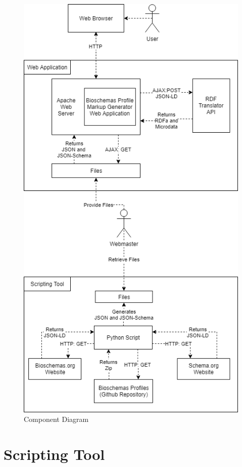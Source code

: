 \newpage
\vspace*{2em}
\begin{figure}[!h]
 \centering\includegraphics[scale=0.6]{images/ComponentDiagram.png}
   \caption{Component Diagram}
   \label{fig:componentDiagram}
\end{figure}

\newpage
\section{Scripting Tool}\label{sec:scriptingtool}

